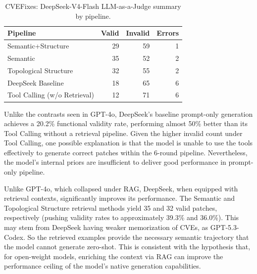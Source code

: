\begin{table}[H]
  \centering
  \small
  \caption{CVEFixes: DeepSeek-V4-Flash LLM-as-a-Judge summary by pipeline.}
  \label{tab:deepseek_judge_summary}
  \begin{tabular}{lrrr}
    \toprule
    \textbf{Pipeline} & \textbf{Valid} & \textbf{Invalid} & \textbf{Errors} \\
    \midrule
    Semantic+Structure & 29 & 59 & 1 \\
    Semantic & 35 & 52 & 2 \\
    Topological Structure & 32 & 55 & 2 \\
    DeepSeek Baseline &  18 & 65 & 6 \\
    Tool Calling (w/o Retrieval) & 12 & 71 & 6 \\
    \bottomrule
  \end{tabular}
\end{table}

Unlike the contrasts seen in GPT-4o, DeepSeek's baseline prompt-only generation achieves a 20.2\% functional validity rate, performing almost 50\% better than its Tool Calling without a retrieval pipeline. 
Given the higher invalid count under Tool Calling, one possible explanation is that the model is unable to use the tools effectively to generate correct patches within the 6-round pipeline.
Nevertheless, the model's internal priors are insufficient to deliver good performance in prompt-only pipeline.

Unlike GPT-4o, which collapsed under RAG, DeepSeek, when equipped with retrieval contexts, significantly improves its performance. 
The Semantic and Topological Structure retrieval methods yield 35 and 32 valid patches, respectively (pushing validity rates to approximately 39.3\% and 36.0\%). 
This may stem from DeepSeek having weaker memorization of CVEs, as GPT-5.3-Codex. So the retrieved examples provide the necessary semantic trajectory that the model cannot generate zero-shot. This is consistent with the hypothesis that, for open-weight models, enriching the context via RAG can improve the performance ceiling of the model's native generation capabilities.


